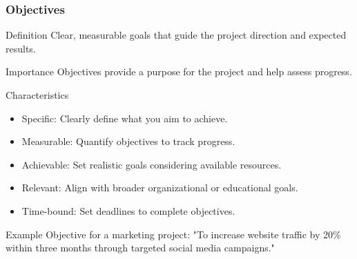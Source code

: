 \documentclass[aspectratio=169]{beamer}
\begin{document}
\begin{frame}[fragile]
    \frametitle{Objectives}
    \begin{block}{Definition}
        Clear, measurable goals that guide the project direction and expected results.
    \end{block}
    \begin{block}{Importance}
        Objectives provide a purpose for the project and help assess progress.
    \end{block}
    \begin{block}{Characteristics}
        \begin{itemize}
            \item Specific: Clearly define what you aim to achieve.
            \item Measurable: Quantify objectives to track progress.
            \item Achievable: Set realistic goals considering available resources.
            \item Relevant: Align with broader organizational or educational goals.
            \item Time-bound: Set deadlines to complete objectives.
        \end{itemize}
    \end{block}
    \begin{block}{Example}
        Objective for a marketing project: "To increase website traffic by 20\% within three months through targeted social media campaigns."
    \end{block}
\end{frame}
\end{document}
